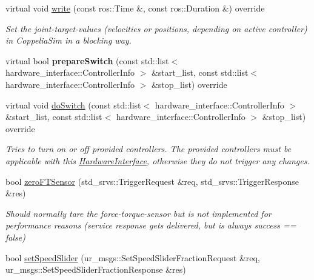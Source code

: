 \begin{DoxyCompactItemize}
\mbox{\label{classcoppeliasim__interface_1_1HardwareInterface_a2a116645fc33233e4b9b1a37a9165674}} 
virtual void \hyperlink{classcoppeliasim__interface_1_1HardwareInterface_a2a116645fc33233e4b9b1a37a9165674}{write} (const ros\+::\+Time \&, const ros\+::\+Duration \&) override
\begin{DoxyCompactList}\small\item\em Set the joint-\/target-\/values (velocities or positions, depending on active controller) in Coppelia\+Sim in a blocking way. \end{DoxyCompactList}\item 
\mbox{\label{classcoppeliasim__interface_1_1HardwareInterface_a5b7c2e8dcf2fa17ba6bde7ea001d59e3}} 
virtual bool {\bfseries prepare\+Switch} (const std\+::list$<$ hardware\+\_\+interface\+::\+Controller\+Info $>$ \&start\+\_\+list, const std\+::list$<$ hardware\+\_\+interface\+::\+Controller\+Info $>$ \&stop\+\_\+list) override
\item 
virtual void \hyperlink{classcoppeliasim__interface_1_1HardwareInterface_aae36a63c5125172387cfcbf21f9a1c24}{do\+Switch} (const std\+::list$<$ hardware\+\_\+interface\+::\+Controller\+Info $>$ \&start\+\_\+list, const std\+::list$<$ hardware\+\_\+interface\+::\+Controller\+Info $>$ \&stop\+\_\+list) override
\begin{DoxyCompactList}\small\item\em Tries to turn on or off provided controllers. The provided controllers must be applicable with this \hyperlink{classcoppeliasim__interface_1_1HardwareInterface}{Hardware\+Interface}, otherwise they do not trigger any changes. \end{DoxyCompactList}\item 
bool \hyperlink{classcoppeliasim__interface_1_1HardwareInterface_af3204245bbf1e9e317d5d0a57b3c86c2}{zero\+F\+T\+Sensor} (std\+\_\+srvs\+::\+Trigger\+Request \&req, std\+\_\+srvs\+::\+Trigger\+Response \&res)
\begin{DoxyCompactList}\small\item\em Should normally tare the force-\/torque-\/sensor but is not implemented for performance reasons (service response gets delivered, but is always \textquotesingle{}success == false\textquotesingle{}) \end{DoxyCompactList}\item 
bool \hyperlink{classcoppeliasim__interface_1_1HardwareInterface_a0fb3b4bf382fc390db4d8c40036a683b}{set\+Speed\+Slider} (ur\+\_\+msgs\+::\+Set\+Speed\+Slider\+Fraction\+Request \&req, ur\+\_\+msgs\+::\+Set\+Speed\+Slider\+Fraction\+Response \&res)

\end{DoxyCompactItemize}
